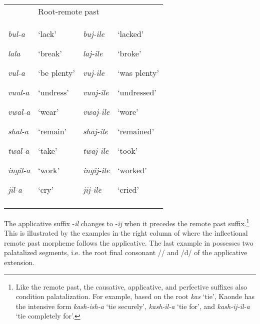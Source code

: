 \documentclass[output=paper]{langsci/langscibook}
\begin{document}
\begin{tabular}{llll}
\lsptoprule
\multicolumn{2}{l}{\mdseries Root/stem-FV} & \multicolumn{2}{l}{\mdseries Root-remote past}\\
{\mdseries \emph{bul-a}}

{\mdseries \emph{lala}}

{\mdseries \emph{vul-a}}

{\mdseries \emph{vuul-a}}

{\mdseries \emph{vwal-a}}

{\mdseries \emph{shal-a}}

{\mdseries \emph{twal-a}}

{\mdseries \emph{ingil-a}}

\mdseries \emph{jil-a} & {\mdseries ‘lack’}

{\mdseries ‘break’}

{\mdseries ‘be plenty’}

{\mdseries ‘undress’}

{\mdseries ‘wear’}

{\mdseries ‘remain’}

{\mdseries ‘take’}

{\mdseries ‘work’}

\mdseries ‘cry’ & {\mdseries \emph{buj-ile}}

{\mdseries \emph{laj-ile}}

{\mdseries \emph{vuj-ile}}

{\mdseries \emph{vuuj-ile}}

{\mdseries \emph{vwaj-ile}}

{\mdseries \emph{shaj-ile}}

{\mdseries \emph{twaj-ile} }

{\mdseries \emph{ingij-ile}}

\mdseries \emph{jij-ile} & {\mdseries ‘lacked’}

{\mdseries ‘broke’}

{\mdseries ‘was plenty’}

{\mdseries ‘undressed’}

{\mdseries ‘wore’}

{\mdseries ‘remained’}

{\mdseries ‘took’}

{\mdseries ‘worked’}

\mdseries ‘cried’\\
\lspbottomrule
\end{tabular}
The applicative suffix -\emph{il} changes to -\emph{ij}\textit{ }when it precedes the remote past suffix.\footnote{ Like the remote past, the causative, applicative, and perfective suffixes also condition palatalization. For example, based on the root \textit{kas} ‘tie’, Kaonde has the intensive form \textit{kash-ish-a} ‘tie securely’, \textit{kash-il-a} ‘tie for’, and \textit{kash-ij-il-a} ‘tie completely for’. \par   \par } This is illustrated by the examples in the right column of  where the inflectional remote past morpheme follows the applicative. The last example in  possesses two palatalized segments, i.e. the root final consonant // and /d/ of the applicative extension. 
\end{document}
